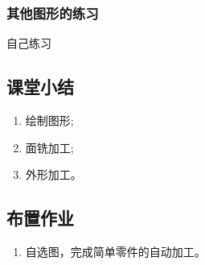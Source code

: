 \subsubsection{其他图形的练习}

自己练习










\subsection{课堂小结}
\begin{enumerate}[1、]
	\item 绘制图形;
	\item 面铣加工;
	\item 外形加工。
\end{enumerate}

\vfill
\subsection{布置作业}
\begin{enumerate}[1、]
	\item 自选图，完成简单零件的自动加工。
\end{enumerate}
\vfill